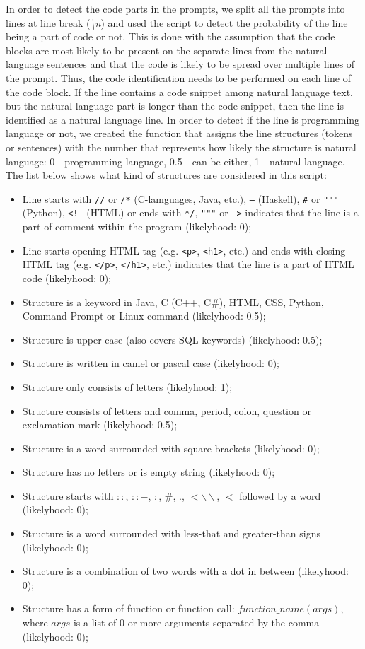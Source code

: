 In order to detect the code parts in the prompts, we split all the prompts into lines at line break (\textit{\textbackslash n}) and used the script to detect the probability of the line being a part of code or not. This is done with the assumption that the code blocks are most likely to be present on the separate lines from the natural language sentences and that the code is likely to be spread over multiple lines of the prompt. Thus, the code identification needs to be performed on each line of the code block. If the line contains a code snippet among natural language text, but the natural language part is longer than the code snippet, then the line is identified as a natural language line. In order to detect if the line is programming language or not, we created the function that assigns the line structures (tokens or sentences) with the number that represents how likely the structure is natural language: 0 - programming language, 0.5 - can be either, 1 - natural language. The list below shows what kind of structures are considered in this script:
\begin{itemize}
    \item Line starts with \texttt{//} or \texttt{/*} (C-lamguages, Java, etc.), \texttt{--} (Haskell), \texttt{\#} or \texttt{"""} (Python), \texttt{<!--} (HTML) or ends with \texttt{*/}, \texttt{"""} or \texttt{-->} indicates that the line is a part of comment within the program (likelyhood: 0);
    \item Line starts opening HTML tag (e.g. \texttt{<p>}, \texttt{<h1>}, etc.) and ends with closing HTML tag (e.g. \texttt{</p>}, \texttt{</h1>}, etc.) indicates that the line is a part of HTML code (likelyhood: 0);
    \item Structure is a keyword in Java, C (C++, C\#), HTML, CSS, Python, Command Prompt or Linux command (likelyhood: 0.5);
    \item Structure is upper case (also covers SQL keywords) (likelyhood: 0.5);
    \item Structure is written in camel or pascal case (likelyhood: 0);
    \item Structure only consists of letters (likelyhood: 1);
    \item Structure consists of letters and comma, period, colon, question or exclamation mark (likelyhood: 0.5);
    \item Structure is a word surrounded with square brackets (likelyhood: 0);
    \item Structure has no letters or is empty string (likelyhood: 0);
    \item Structure starts with $::$, $::-$, $:$, $\#$, $.$, $<\backslash \backslash$, $<$ followed by a word (likelyhood: 0);
    \item Structure is a word surrounded with less-that and greater-than signs (likelyhood: 0);
    \item Structure is a combination of two words with a dot in between (likelyhood: 0);
    \item Structure has a form of function or function call: $function\_name(args)$, where $args$ is a list of 0 or more arguments separated by the comma (likelyhood: 0);
\end{itemize}

